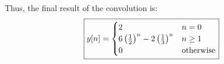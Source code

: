 \documentclass[a4paper, 10pt]{article}
\begin{document}
\begin{tosubmit}
Thus, the final result of the convolution is:
\[ \boxed{
y[n] = \begin{cases}
2 & n = 0 \\
6 \left( \frac{1}{2} \right)^n - 2 \left( \frac{1}{3} \right)^n & n \geq 1 \\
0 & \text{otherwise}
\end{cases}
} \]
\end{tosubmit}
\end{document}
